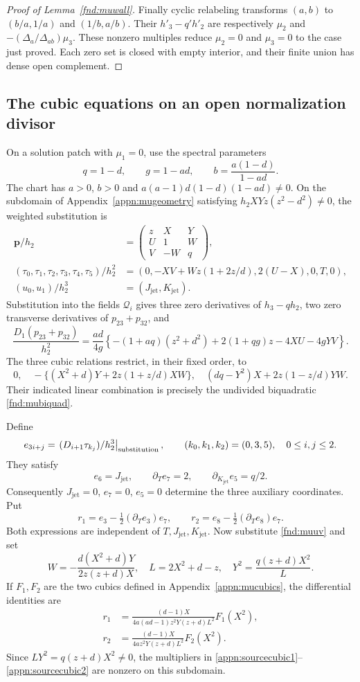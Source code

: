 \documentclass[11pt,a4paper]{article}
\numberwithin{equation}{section}
\theoremstyle{plain}
\theoremstyle{definition}
\theoremstyle{remark}
\begin{document}
\begin{proof}[Proof of Lemma~\ref{fnd:muwall}]
Finally cyclic relabeling transforms $(a,b)$ to $(b/a,1/a)$ and $(1/b,a/b)$. Their $h'_3-q'h'_2$ are respectively $\mu_2$ and $-(\Delta_a/\Delta_{ab})\mu_3$. These nonzero multiples reduce $\mu_2=0$ and $\mu_3=0$ to the case just proved. Each zero set is closed with empty interior, and their finite union has dense open complement.
\end{proof}

\subsection{The cubic equations on an open normalization divisor}
\label{appn:musources}

On a solution patch with $\mu_1=0$, use the spectral parameters
\[
 q=1-d,\qquad g=1-ad,\qquad b=\frac{a(1-d)}{1-ad}.
\]
The chart has $a>0$, $b>0$ and
$a(a-1)d(1-d)(1-ad)\ne0$. On the subdomain of
Appendix~\ref{appn:mugeometry} satisfying $h_2XYz(z^2-d^2)\ne0$,
the weighted substitution is
\begin{align*}
 \boldsymbol p/h_2&=\begin{pmatrix}z&X&Y\\U&1&W\\V&-W&q\end{pmatrix},\\
 (\tau_0,\tau_1,\tau_2,\tau_3,\tau_4,\tau_5)/h_2^2
 &=(0,-XV+Wz(1+2z/d),2(U-X),0,T,0),\\
 (u_0,u_1)/h_2^3&=(J_{\mathrm{jet}},K_{\mathrm{jet}}).
\end{align*}
Substitution into the fields $\mathcal Q_i$
gives three zero derivatives of $h_3-qh_2$, two zero transverse
derivatives of $p_{23}+p_{32}$, and
\[
 \frac{D_1(p_{23}+p_{32})}{h_2^2}
 =\frac{ad}{4g}\left\{-(1+aq)(z^2+d^2)
             +2(1+qg)z-4XU-4gYV\right\}.
\]
The three cubic relations restrict, in their fixed order, to
\[
 0,\quad -\{(X^2+d)Y+2z(1+z/d)XW\},\quad
 (dq-Y^2)X+2z(1-z/d)YW.
\]
Their indicated linear combination is precisely the undivided
biquadratic \eqref{fnd:mubiquad}.

Define
\[
 e_{3i+j}=\left.(D_{i+1}\tau_{k_j})/h_2^3\right|_{\rm substitution},
 \qquad (k_0,k_1,k_2)=(0,3,5),\quad 0\le i,j\le2.
\]
They satisfy
\[
 e_6=J_{\mathrm{jet}},\qquad \partial_Te_7=2,\qquad
 \partial_{K_{\mathrm{jet}}}e_5=q/2.
\]
Consequently $J_{\mathrm{jet}}=0$, $e_7=0$, $e_5=0$ determine the three auxiliary
coordinates. Put
\[
 r_1=e_3-\tfrac12(\partial_Te_3)e_7,
 \qquad r_2=e_8-\tfrac12(\partial_Te_8)e_7.
\]
Both expressions are independent of $T,J_{\mathrm{jet}},K_{\mathrm{jet}}$.
Now substitute \eqref{fnd:muuv} and set
\[
 W=-\frac{d(X^2+d)Y}{2z(z+d)X},\quad
 L=2X^2+d-z,\quad Y^2=\frac{q(z+d)X^2}{L}.
\]
If $F_1,F_2$ are the two cubics defined in Appendix~\ref{appn:mucubics},
the differential identities are
\begin{align}
 r_1&=\frac{(d-1)X}{4a(ad-1)z^2Y(z+d)L^2}F_1(X^2),
          \label{appn:sourcecubic1}\\
 r_2&=\frac{(d-1)X}{4az^2Y(z+d)L^2}F_2(X^2).
          \label{appn:sourcecubic2}
\end{align}
Since $LY^2=q(z+d)X^2\ne0$, the multipliers in
\eqref{appn:sourcecubic1}--\eqref{appn:sourcecubic2} are nonzero on this
subdomain.
\end{document}
